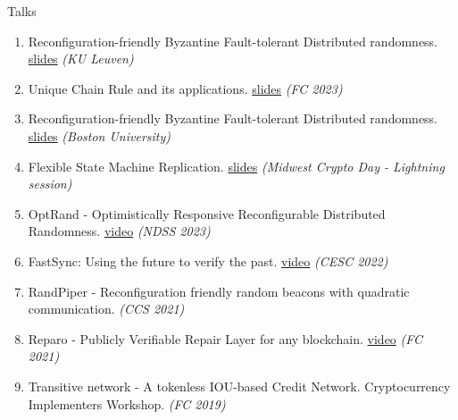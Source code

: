 \documentclass{resume}
\begin{document}
\begin{rSection}{Talks}
\label{sec:org082a94d}
\begin{enumerate}
\item Reconfiguration-friendly Byzantine Fault-tolerant Distributed randomness. \href{https://adithyabhatkajake.github.io/assets/presentations/KU-Leuven-RandomBeacons.pptx}{slides}  \hfill  \emph{(KU Leuven)}
\item Unique Chain Rule and its applications. \href{https://adithyabhatkajake.github.io/assets/presentations/Unique-Chain-Rule-Applications.pptx}{slides}  \hfill  \emph{(FC 2023)}
\item Reconfiguration-friendly Byzantine Fault-tolerant Distributed randomness. \href{https://adithyabhatkajake.github.io/assets/presentations/BU-RandomBeacons.pptx}{slides}  \hfill  \emph{(Boston University)}
\item Flexible State Machine Replication. \href{https://adithyabhatkajake.github.io/assets/presentations/Midwest-crypto-day-Lightning-Talk.pptx}{slides}  \hfill  \emph{(Midwest Crypto Day - Lightning session)}
\item OptRand - Optimistically Responsive Reconfigurable Distributed Randomness. \href{https://www.youtube.com/watch?v=6DH2bGXP3-4}{video}  \hfill  \emph{(NDSS 2023)}
\item FastSync: Using the future to verify the past. \href{https://www.youtube.com/watch?v=kCqrd1MQ1no\&t=3341s}{video} \hfill  \emph{(CESC 2022)}
\item RandPiper - Reconfiguration friendly random beacons with quadratic communication. \hfill  \emph{(CCS 2021)}
\item Reparo - Publicly Verifiable Repair Layer for any blockchain. \href{https://youtube.com/watch?v=jV\_Pjc17eWY}{video}  \hfill  \emph{(FC 2021)}
\item Transitive network - A tokenless IOU-based Credit Network. Cryptocurrency Implementers Workshop.  \hfill  \emph{(FC 2019)}
\end{enumerate}
\end{rSection}
\end{document}
